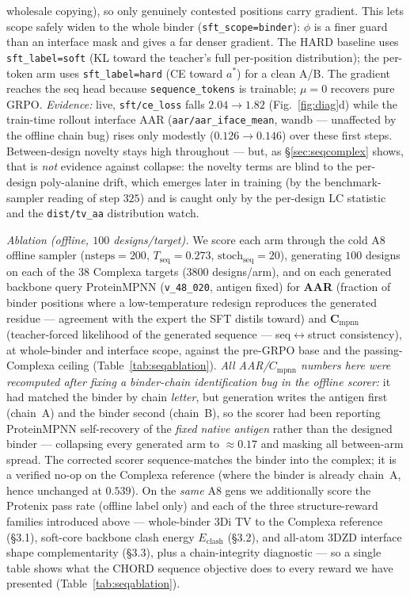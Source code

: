 \documentclass[11pt]{article}
\newcommand{\ttk}[1]{\texttt{\small #1}}
\begin{document}
wholesale copying), so only genuinely contested positions carry gradient. This lets scope safely
widen to the whole binder (\ttk{sft\_scope=binder}): $\phi$ is a finer guard than an interface
mask and gives a far denser gradient. The HARD baseline uses \ttk{sft\_label=soft} (KL toward the
teacher's full per-position distribution); the per-token arm uses \ttk{sft\_label=hard} (CE toward
$a^{\ast}$) for a clean A/B. The gradient reaches the seq head because \ttk{sequence\_tokens} is
trainable; $\mu{=}0$ recovers pure GRPO.
\emph{Evidence:} live, \ttk{sft/ce\_loss} falls $2.04\!\to\!1.82$ (Fig.~\ref{fig:diag}d) while the
train-time rollout interface AAR (\ttk{aar/aar\_iface\_mean}, wandb --- unaffected by the offline chain
bug) rises only modestly ($0.126\!\to\!0.146$) over these first steps. Between-design novelty stays high
throughout --- but, as \S\ref{sec:seqcomplex} shows, that is \emph{not} evidence against collapse: the
novelty terms are blind to the per-design poly-alanine drift, which emerges later in training (by the
benchmark-sampler reading of step $325$) and is caught only by the per-design $\mathrm{LC}$ statistic and
the \ttk{dist/tv\_aa} distribution watch.

\emph{Ablation (offline, $100$ designs/target).} We score each arm through the cold A8 offline sampler
($\mathrm{nsteps}{=}200$, $T_{\mathrm{seq}}{=}0.273$, $\mathrm{stoch}_{\mathrm{seq}}{=}20$), generating
$100$ designs on each of the $38$ Complexa targets ($3800$ designs/arm), and on each generated backbone
query ProteinMPNN (\ttk{v\_48\_020}, antigen fixed) for \textbf{AAR} (fraction of binder positions where a
low-temperature redesign reproduces the generated residue --- agreement with the expert the SFT distils
toward) and $\mathbf{C_{\mathrm{mpnn}}}$ (teacher-forced likelihood of the generated sequence ---
seq$\leftrightarrow$struct consistency), at whole-binder and interface scope, against the pre-GRPO base
and the passing-Complexa ceiling (Table~\ref{tab:seqablation}). \emph{All AAR/$C_{\mathrm{mpnn}}$ numbers
here were recomputed after fixing a binder-chain identification bug in the offline scorer:} it had matched
the binder by chain \emph{letter}, but generation writes the antigen first (chain~A) and the binder second
(chain~B), so the scorer had been reporting ProteinMPNN self-recovery of the \emph{fixed native antigen}
rather than the designed binder --- collapsing every generated arm to $\approx\!0.17$ and masking all
between-arm spread. The corrected scorer sequence-matches the binder into the complex; it is a verified
no-op on the Complexa reference (where the binder is already chain~A, hence unchanged at $0.539$).
On the \emph{same} A8 gens we additionally score the Protenix pass rate (offline label only) and each of
the three structure-reward families introduced above --- whole-binder 3Di TV to the Complexa reference (\S3.1),
soft-core backbone clash energy $E_{\mathrm{clash}}$ (\S3.2), and all-atom 3DZD interface shape complementarity
(\S3.3), plus a chain-integrity diagnostic --- so a single table shows what the CHORD sequence objective does to every reward we have
presented (Table~\ref{tab:seqablation}).
\end{document}

